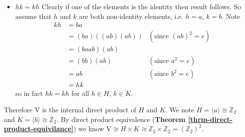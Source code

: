 \begin{enumerate}
\begin{itemize}
        \item $\boxed{hk = kh}$ Clearly if one of the elements is the identity then result follows. So assume that $h$ and $k$ are both non-identity elements, i.e. $h = a$, $k = b$. Note
        \begin{align*}
            kh &= ba\\
            &= (ba)\left((ab)(ab)\right) & (\text{since }(ab)^2 = e)\\
            &= (baab)(ab)\\
            &= (bb)(ab) & (\text{since }a^2 = e)\\
            &= ab & (\text{since }b^2 = e)\\
            &= hk
        \end{align*}
        so in fact $hk = kh$ for all $h \in H$, $k \in K$.
    \end{itemize}
    Therefore $\mathrm{V}$ is the internal direct product of $H$ and $K$. We note $H = \langle a\rangle \cong \mathbb{Z}_2$ and $K = \langle b \rangle \cong \mathbb{Z}_2$. By direct product equivalence (\textbf{Theorem \ref{thrm-direct-product-equivilance}}) we know $\mathrm{V} \cong H \times K \cong \mathbb{Z}_2 \times \mathbb{Z}_2 = (\mathbb{Z}_2)^2$.
\end{enumerate}

